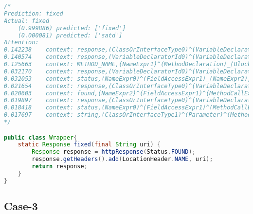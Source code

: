 \begin{lstlisting}[basicstyle=\tiny,caption={Case-2 fixed}, label={},language=Java,breaklines=true,
  postbreak=\mbox{\textcolor{red}{$\hookrightarrow$}\space}]
/*
Prediction:	fixed
Actual:	fixed
	(0.999886) predicted: ['fixed']
	(0.000081) predicted: ['satd']
Attention:
0.142238	context: response,(ClassOrInterfaceType0)^(VariableDeclarationExpr)_(VariableDeclarator)_(MethodCallExpr1)_(FieldAccessExpr1)_(NameExpr2),found
0.140574	context: response,(VariableDeclaratorId0)^(VariableDeclarator)_(MethodCallExpr1)_(FieldAccessExpr1)_(NameExpr2),found
0.125663	context: METHOD_NAME,(NameExpr1)^(MethodDeclaration)_(BlockStmt)_(ExpressionStmt)_(VariableDeclarationExpr)_(VariableDeclarator)_(MethodCallExpr1)_(FieldAccessExpr1)_(NameExpr2),found
0.032170	context: response,(VariableDeclaratorId0)^(VariableDeclarator)_(MethodCallExpr1)_(FieldAccessExpr1)_(NameExpr0),status
0.032053	context: status,(NameExpr0)^(FieldAccessExpr1)_(NameExpr2),found
0.021654	context: response,(ClassOrInterfaceType0)^(VariableDeclarationExpr)^(ExpressionStmt)^(BlockStmt)_(ExpressionStmt)_(MethodCallExpr0)_(FieldAccessExpr2)_(NameExpr0),locationheader
0.020603	context: found,(NameExpr2)^(FieldAccessExpr1)^(MethodCallExpr)^(VariableDeclarator)^(VariableDeclarationExpr)^(ExpressionStmt)^(BlockStmt)_(ReturnStmt)_(NameExpr0),response
0.019897	context: response,(ClassOrInterfaceType0)^(VariableDeclarationExpr)_(VariableDeclarator)_(MethodCallExpr1)_(FieldAccessExpr1)_(NameExpr0),status
0.018418	context: status,(NameExpr0)^(FieldAccessExpr1)^(MethodCallExpr)^(VariableDeclarator)^(VariableDeclarationExpr)^(ExpressionStmt)^(BlockStmt)_(ReturnStmt)_(NameExpr0),response
0.017697	context: string,(ClassOrInterfaceType1)^(Parameter)^(MethodDeclaration)_(BlockStmt)_(ExpressionStmt)_(MethodCallExpr0)_(FieldAccessExpr2)_(NameExpr0),locationheader
*/

public class Wrapper{
    static Response fixed(final String uri) {
        Response response = httpResponse(Status.FOUND);
        response.getHeaders().add(LocationHeader.NAME, uri);
        return response;
    }
}
\end{lstlisting}


\subsection{Case-3}

